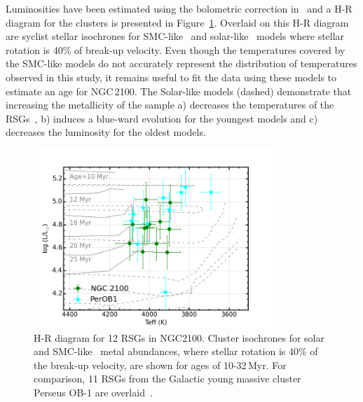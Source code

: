 \documentclass[useAMS,usenatbib]{mn2e}
\begin{document}
Luminosities have been estimated using the bolometric correction in~\cite{2013ApJ...767....3D} and a H-R diagram for the clusters is presented in Figure~\ref{fig:HRD}.
Overlaid on this H-R diagram are {\sc syclist} stellar isochrones for SMC-like~\citep[solid lines,][]{2013A&A...558A.103G} and solar-like~\citep[dashed lines,][]{2012A&A...537A.146E} models where stellar rotation is 40\% of break-up velocity.
Even though the temperatures covered by the SMC-like models do not accurately represent the distribution of temperatures observed in this study, it remains useful to fit the data using these models to estimate an age for NGC\,2100.
The Solar-like models (dashed) demonstrate that increasing the metallicity of the sample
a) decreases the temperatures of the RSGs~\citep[something which is not observed by][]{2015ApJ...803...14P},
b) induces a blue-ward evolution for the youngest models and
c) decreases the luminosity for the oldest models.



\begin{figure}
 \includegraphics[width=9.0cm]{NGC2100-HRD-perOB1}
 \caption{H-R diagram for 12 RSGs in NGC2100.
  Cluster isochrones for solar~\citep[dashed lines;][]{2012A&A...537A.146E} and SMC-like~\citep[solid lines;][]{2013A&A...558A.103G} metal abundances,
  where stellar rotation is 40\% of the break-up velocity, are shown for ages of 10-32\,Myr. For comparison, 11 RSGs from the Galactic young massive cluster Perseus OB-1 are overlaid~\citep{2014ApJ...788...58G}.\label{fig:HRD}
          }
\end{figure}
\end{document}
